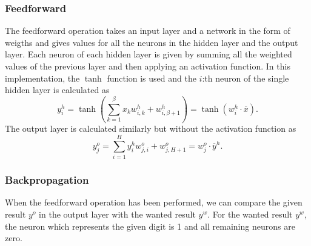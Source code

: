 \documentclass[report.tex]{subfile}
\begin{document}
\subsubsection{Feedforward}
The feedforward operation takes an input layer and a network in the form of
weigths and gives values for all the neurons in the hidden layer and the output
layer. Each neuron of each hidden layer is given by summing all the weighted
values of the previous layer and then applying an activation function. In this
implementation, the $\tanh$ function is used and the $i$:th neuron of the
single hidden layer is calculated as
\begin{equation*}
    y^h_i = \tanh \left(
                    \sum_{k=1}^{\beta} x_k w^h_{i,k} + w^h_{i,\beta+1}
                   \right)
           = \tanh \left( w^h_i \cdot \overline x \right).
\end{equation*}
The output layer is calculated similarly but without the activation function as
\begin{equation*}
    y^o_j = \sum_{i=1}^{H} y^h_i w^o_{j,i} + w^o_{j,H+1}
          = w^o_j \cdot \overline y^h.
\end{equation*}

\subsubsection{Backpropagation}
When the feedforward operation has been performed, we can compare the given
result $y^o$ in the output layer with the wanted result $y^w$. For the wanted
result $y^w$, the neuron which represents the given digit is 1 and all
remaining neurons are zero.
\end{document}
